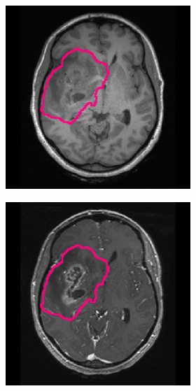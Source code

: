 \begin{subappendices}
\begin{figure}[htbp]
\begin{subfigure}[b]{0.95\textwidth}
\begin{subfigure}[b]{0.215\textwidth}
        \includegraphics[width=\textwidth, clip, trim=2.5cm 0.5cm 2.5cm 0.5cm]{Figures/Random_segs/T1_TCGA-14-3477.png}
        \end{subfigure}
        \hfill
        \begin{subfigure}[b]{0.215\textwidth}
        \includegraphics[width=\textwidth, clip, trim=2.5cm 0.5cm 2.5cm 0.5cm]{Figures/Random_segs/T1GD_TCGA-14-3477.png}

\end{subfigure}
\end{subfigure}
\end{figure}
\end{subappendices}
